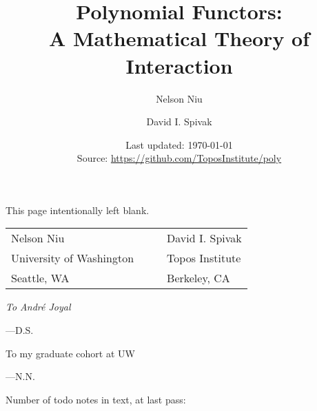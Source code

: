 \documentclass[11pt]{memoir}
\newcommand{\titlefont}{\normalfont\Huge\bfseries}
\theoremstyle{plain}
\theoremstyle{plain}
\theoremstyle{remark}
\newcommand{\Cat}[1]{\mathbf{#1}}%
\newenvironment{dedication}
     {\begin{flushright}\itshape}
     {\end{flushright}}
\newcommand{\poly}[1][]{#1\Cat{Poly}}
\newcommand{\0}{\textsf{0}}
\newcommand{\1}{\textsf{1}}
\newcommand{\2}{\textsf{2}}
\newcommand{\3}{\textsf{3}}
\newcommand{\4}{\textsf{4}}
\newcommand{\5}{\textsf{5}}
\newcommand{\6}{\textsf{6}}
\newcommand{\7}{\textsf{7}}
\newcommand{\8}{\textsf{8}}
\newcommand{\9}{\textsf{9}}
\newcounter{notecounter}
\newcommand{\numnotes}{\clearpage\huge Number of todo notes in text, at last pass: \thenotecounter\normalsize}
\begin{document}
\frontmatter



\title{\titlefont Polynomial Functors:\\\medskip
A Mathematical Theory of Interaction}

\author{
\LARGE Nelson Niu
\and
\LARGE David I. Spivak
\normalsize}

\posttitle{
\vspace{.8in}
\normalsize
\[
\coverpic
\]
  \vspace{.5in}
  \endgroup
}
\date{\vfill Last updated: \today \\ Source: \url{https://github.com/ToposInstitute/poly}}

\maketitle

\thispagestyle{empty}
\clearpage
This page intentionally left blank.
\clearpage
\clearpage

\mbox{}
\vspace{2in}
\begin{center}
\begin{tabular}{lll}
\LARGE Nelson Niu&~\hspace{.75in}~&\LARGE  David I. Spivak\\
\large University of Washington&&\large Topos Institute\\
\large Seattle, WA&&\large Berkeley, CA
\end{tabular}
\end{center}
\clearpage

\begin{dedication}
To Andr\'e Joyal
\smallskip

---D.S.
\bigskip

To my graduate cohort at UW
\smallskip

---N.N.
\end{dedication}



\clearpage
\tableofcontents*
\clearpage

\mainmatter




\appendix
\begingroup
\footnotesize

\backmatter

\printbibliography
\printindex

\numnotes
\end{document}
